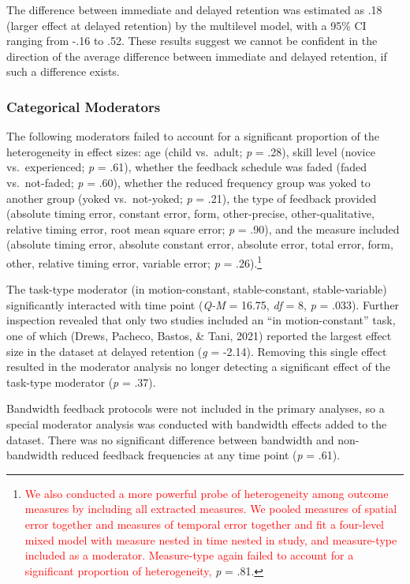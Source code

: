 \documentclass[
  english,
  man, donotrepeattitle,mask,floatsintext]{apa7}
\begin{document}
The difference between immediate and delayed retention was estimated as .18 (larger effect at delayed retention) by the multilevel model, with a 95\% CI ranging from -.16 to .52. These results suggest we cannot be confident in the direction of the average difference between immediate and delayed retention, if such a difference exists.

\hypertarget{categorical-moderators}{%
\subsubsection{Categorical Moderators}\label{categorical-moderators}}

The following moderators failed to account for a significant proportion of the heterogeneity in effect sizes: age (child vs.~adult; \emph{p} = .28), skill level (novice vs.~experienced; \emph{p} = .61), whether the feedback schedule was faded (faded vs.~not-faded; \emph{p} = .60), whether the reduced frequency group was yoked to another group (yoked vs.~not-yoked; \emph{p} = .21), the type of feedback provided (absolute timing error, constant error, form, other-precise, other-qualitative, relative timing error, root mean square error; \emph{p} = .90), and the measure included (absolute timing error, absolute constant error, absolute error, total error, form, other, relative timing error, variable error; \emph{p} = .26).\footnote{\textcolor{red}{We also conducted a more powerful probe of heterogeneity among outcome measures by including all extracted measures. We pooled measures of spatial error together and measures of temporal error together and fit a four-level mixed model with measure nested in time nested in study, and measure-type included as a moderator. Measure-type again failed to account for a significant proportion of heterogeneity,} \emph{p} = .81.}

The task-type moderator (in motion-constant, stable-constant, stable-variable) significantly interacted with time point (\emph{Q-M} = 16.75, \emph{df} = 8, \emph{p} = .033). Further inspection revealed that only two studies included an ``in motion-constant'' task, one of which (Drews, Pacheco, Bastos, \& Tani, 2021) reported the largest effect size in the dataset at delayed retention (\emph{g} = -2.14). Removing this single effect resulted in the moderator analysis no longer detecting a significant effect of the task-type moderator (\emph{p} = .37).

Bandwidth feedback protocols were not included in the primary analyses, so a special moderator analysis was conducted with bandwidth effects added to the dataset. There was no significant difference between bandwidth and non-bandwidth reduced feedback frequencies at any time point (\emph{p} = .61).
\end{document}
